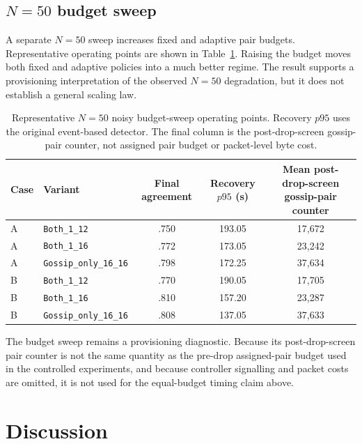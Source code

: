 \documentclass[11pt]{article}
\begin{document}
\subsection{\texorpdfstring{$N=50$}{N=50} budget sweep}
A separate $N=50$ sweep increases fixed and adaptive pair budgets. Representative operating points are shown in Table~\ref{tab:n50-budget}. Raising the budget moves both fixed and adaptive policies into a much better regime. The result supports a provisioning interpretation of the observed $N=50$ degradation, but it does not establish a general scaling law.

\begin{table}[H]
\centering
\caption{Representative $N=50$ noisy budget-sweep operating points. Recovery $p95$ uses the original event-based detector. The final column is the post-drop-screen gossip-pair counter, not assigned pair budget or packet-level byte cost.}
\label{tab:n50-budget}
\scriptsize
\begin{tabular}{llccc}
\toprule
Case & Variant & Final agreement & Recovery $p95$ (s) & Mean post-drop-screen gossip-pair counter\\
\midrule
A & \texttt{Both\_1\_12} & .750 & 193.05 & 17,672\\
A & \texttt{Both\_1\_16} & .772 & 173.05 & 23,242\\
A & \texttt{Gossip\_only\_16\_16} & .798 & 172.25 & 37,634\\
B & \texttt{Both\_1\_12} & .770 & 190.05 & 17,705\\
B & \texttt{Both\_1\_16} & .810 & 157.20 & 23,287\\
B & \texttt{Gossip\_only\_16\_16} & .808 & 137.05 & 37,633\\
\bottomrule
\end{tabular}
\end{table}

The budget sweep remains a provisioning diagnostic. Because its post-drop-screen pair counter is not the same quantity as the pre-drop assigned-pair budget used in the controlled experiments, and because controller signalling and packet costs are omitted, it is not used for the equal-budget timing claim above.

\section{Discussion}
\end{document}
